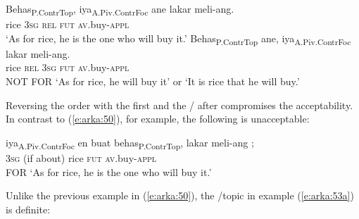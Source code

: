 \documentclass[output=paper
,modfonts
,nonflat]{langsci/langscibook}
\begin{document}
\begin{exe}
	\ex\label{e:arka:51}
	\begin{xlist}
		\ex\label{e:arka:51a}
		\gll {\ob}Behas{\cb}\textsubscript{P.ContrTop},  {\ob}iya{\cb}\textsubscript{A.Piv.ContrFoc}  ane  lakar  meli-ang.\\
		\phantom{[}rice  \phantom{[}3\textsc{sg}     \textsc{rel}    \textsc{fut}  \textsc{av}.buy-\textsc{appl}\\
		\glt ‘As for rice, he is the one who will buy it.’
		\ex\label{e:arka:51b}
		\gll {\USStar} {\ob}Behas{\cb}\textsubscript{P.ContrTop} ane,   {\ob}iya{\cb}\textsubscript{A.Piv.ContrFoc}  lakar  meli-ang.\\
		\phantom{*} \phantom{[}rice       \textsc{rel}  \phantom{[}3\textsc{sg}  \textsc{fut}    \textsc{av}.buy-\textsc{appl}\\
		NOT FOR ‘As for rice, he will buy it’ or ‘It is rice that he will buy.’
	\end{xlist}
\end{exe}

\noindent
Reversing the order with the  first and the / after compromises the acceptability. In contrast to (\ref{e:arka:50}), for example, the following is unacceptable:

\begin{exe}
	\ex\label{e:arka:52}
	\gll {\USQMark}{\USStar}   {\ob}iya{\cb}\textsubscript{A.Piv.ContrFoc}   {\ob}{\USOParen}en   buat{\USCParen}  behas{\cb}\textsubscript{P.ContrTop}, lakar  meli-ang  {\USEmptySet};\\
	\phantom{?*} \phantom{[}3\textsc{sg}   \phantom{[}(if   about)  rice \textsc{fut}  \textsc{av}.buy-\textsc{appl}\\
	FOR ‘As for rice, he is the one who will buy it.’
\end{exe}

\noindent
Unlike the previous example in (\ref{e:arka:50}), the /topic in example (\ref{e:arka:53a}) is definite: 
\end{document}
